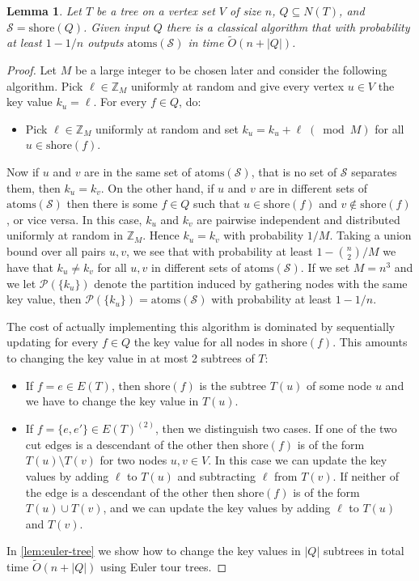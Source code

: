 \documentclass[10pt,a4paper]{article}
\newcommand{\Z}{\mathbb{Z}}
\newcommand{\Pcal}{\mathcal{P}}
\newcommand{\Scal}{\mathcal{S}}
\newcommand{\atoms}{\mathrm{atoms}}
\newcommand{\shore}{\mathrm{shore}}
\newcommand{\tO}{\tilde O}
\newcommand{\1}{\mathbf{1}}
\newtheorem{lemma}[theorem]{Lemma}
\theoremstyle{definition}
\begin{document}
\begin{lemma} \label{lem:2-resp-part}
Let $T$ be a tree on a vertex set $V$ of size $n$, $Q \subseteq N(T)$, and $\Scal = \shore(Q)$.  
Given input $Q$ there is a classical algorithm that with probability at least $1-1/n$ outputs $\atoms(\Scal)$ in time $\tO(n + |Q|)$.
\end{lemma}
\begin{proof}
Let $M$ be a large integer to be chosen later and consider the following algorithm.
Pick $\ell \in \Z_M$ uniformly at random and give every vertex $u \in V$ the key value $k_u = \ell$.
For every $f \in Q$, do:
\begin{itemize}
\item
Pick $\ell \in \Z_M$ uniformly at random and set $k_u = k_u + \ell \;(\bmod M)$ for all $u \in \shore(f)$.
\end{itemize}
Now if $u$ and $v$ are in the same set of $\atoms(\Scal)$, that is no set of $\Scal$ separates them, then $k_u = k_v$.
On the other hand, if $u$ and $v$ are in different sets of $\atoms(\Scal)$ then there is some $f \in Q$ such that $u \in \shore(f)$ and $v \not \in \shore(f)$, or vice versa. In this case,
$k_u$ and $k_v$ are pairwise independent 
and distributed uniformly at random in $\Z_M$.
Hence $k_u = k_v$ with probability $1/M$.
Taking a union bound over all pairs $u,v$, we see that with probability at least $1-\binom{n}{2}/M$ we have that $k_u \neq k_v$ for all $u,v$ in different sets of $\atoms(\Scal)$.
If we set $M = n^3$ and we let $\Pcal(\{k_u\})$ denote the partition induced by gathering nodes with the same key value, then $\Pcal(\{k_u\}) = \atoms(\Scal)$ with probability at least $1 - 1/n$.

The cost of actually implementing this algorithm is dominated by sequentially updating for every $f \in Q$ the key value for all nodes in $\shore(f)$.
This amounts to changing the key value in at most 2 subtrees of $T$:
\begin{itemize}
\item
If $f = e \in E(T)$, then $\shore(f)$ is the subtree $T(u)$ of some node $u$ and we have to change the key value in $T(u)$.
\item
If $f = \{e,e'\} \in E(T)^{(2)}$, then we distinguish two cases.
If one of the two cut edges is a descendant of the other then $\shore(f)$ is of the form $T(u) \setminus T(v)$ for two nodes $u,v \in V$.
In this case we can update the key values by adding $\ell$ to $T(u)$ and subtracting $\ell$ from $T(v)$.
If neither of the edge is a descendant of the other then $\shore(f)$ is of the form $T(u) \cup T(v)$, and we can update the key values by adding $\ell$ to $T(u)$ and $T(v)$.
\end{itemize}
In \cref{lem:euler-tree} we show how to change the key values in $|Q|$ subtrees in total time $\tO(n + |Q|)$ using Euler tour trees.
\end{proof}
\end{document}
